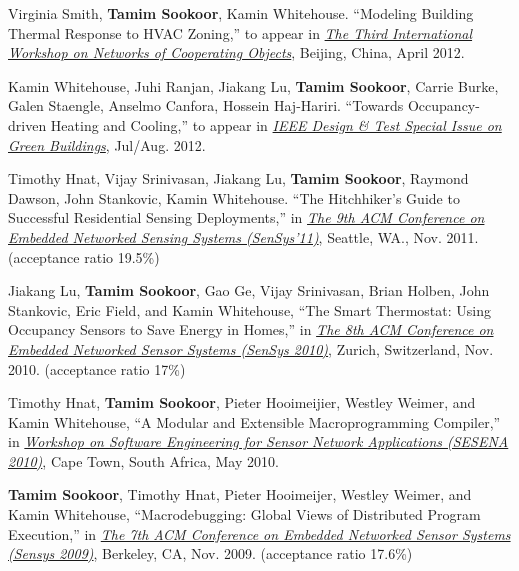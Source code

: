 \documentclass[letterpaper]{article}
\newcommand{\blankline}{\quad\pagebreak[2]}
\begin{document}
\blankline

Virginia Smith, \textbf{Tamim Sookoor}, Kamin Whitehouse. ``Modeling Building
Thermal Response to HVAC Zoning,'' to appear in
\href{http://conet2012.cister-isep.info/}{\textit{The Third International
    Workshop on Networks of Cooperating Objects}}, Beijing, China, April 2012.

\blankline

Kamin Whitehouse, Juhi Ranjan, Jiakang Lu, \textbf{Tamim Sookoor}, Carrie Burke,
Galen Staengle, Anselmo Canfora, Hossein Haj-Hariri. ``Towards Occupancy-driven
Heating and Cooling,'' to appear in
\href{http://www.computer.org/portal/web/computingnow/dtcfp4}{\textit{IEEE
    Design \& Test Special Issue on Green Buildings}}, Jul/Aug. 2012.

\blankline

Timothy Hnat, Vijay Srinivasan, Jiakang Lu, \textbf{Tamim Sookoor}, Raymond
Dawson, John Stankovic, Kamin Whitehouse. ``The Hitchhiker's Guide to Successful
Residential Sensing Deployments,'' in
\href{http://sensys.acm.org/2011/}{\textit{The 9th ACM Conference on Embedded
    Networked Sensing Systems (SenSys'11)}}, Seattle, WA.,
Nov. 2011. (acceptance ratio 19.5\%)

\blankline

Jiakang Lu, \textbf{Tamim Sookoor}, Gao Ge, Vijay Srinivasan, Brian Holben, John
Stankovic, Eric Field, and Kamin Whitehouse, ``The Smart Thermostat: Using
Occupancy Sensors to Save Energy in Homes,'' in
\href{http://sensys.acm.org/2010/}{\textit{The 8th ACM Conference on Embedded
    Networked Sensor Systems (SenSys 2010)}}, Zurich, Switzerland,
Nov. 2010. (acceptance ratio 17\%)

\blankline

Timothy Hnat, \textbf{Tamim Sookoor}, Pieter Hooimeijier, Westley Weimer, and
Kamin Whitehouse, ``A Modular and Extensible Macroprogramming Compiler,'' in
\href{http://www.sesena.info/}{\textit{Workshop on Software Engineering for
    Sensor Network Applications (SESENA 2010)}}, Cape Town, South Africa, May
2010.

\blankline

\textbf{Tamim Sookoor}, Timothy Hnat, Pieter Hooimeijer, Westley Weimer, and Kamin
Whitehouse, ``Macrodebugging: Global Views of Distributed Program Execution,''
in \href{http://sensys.acm.org/2009/}{\textit{The 7th ACM Conference on Embedded
Networked Sensor Systems (Sensys 2009)}}, Berkeley, CA, Nov. 2009. (acceptance
ratio 17.6\%)

\blankline
\end{document}
